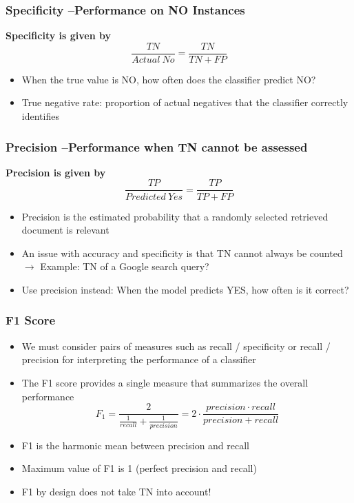 \documentclass[conference, a4paper]{styles/acmsiggraph}
\begin{document}
        \subsubsection{Specificity –Performance on NO Instances}
            \textbf{Specificity is given by} $$\frac{TN}{Actual\ No} = \frac{TN}{TN + FP}$$
            \begin{itemize}
                \item When the true value is NO, how often does the classifier predict NO?
                \item True negative rate: proportion of actual negatives that the classifier correctly identifies
            \end{itemize}

\newpage
        
        \subsubsection{Precision –Performance when TN cannot be assessed}
            \textbf{Precision is given by} $$\frac{TP}{Predicted\ Yes} = \frac{TP}{TP + FP}$$
            \begin{itemize}
                \item Precision is the estimated probability that a randomly selected retrieved document is relevant
                \item An issue with accuracy and specificity is that TN cannot always be counted\newline 
                $\rightarrow$ Example: TN of a Google search query?
                \item Use precision instead: When the model predicts YES, how often is it correct?
            \end{itemize}
        
        \subsubsection{F1 Score}
            \begin{itemize}
                \item We must consider pairs of measures such as recall / specificity or recall / precision for interpreting the performance of a classifier
                \item The F1 score provides a single measure that summarizes the overall performance
                $$F_1 = \frac{2}{\frac{1}{recall} + \frac{1}{precision}} = 2 \cdot \frac{precision \cdot recall}{precision + recall}$$
                \item F1 is the harmonic mean between precision and recall
                \item Maximum value of F1 is 1 (perfect precision and recall)
                \item F1 by design does not take TN into account!
            \end{itemize}
    
\end{document}
